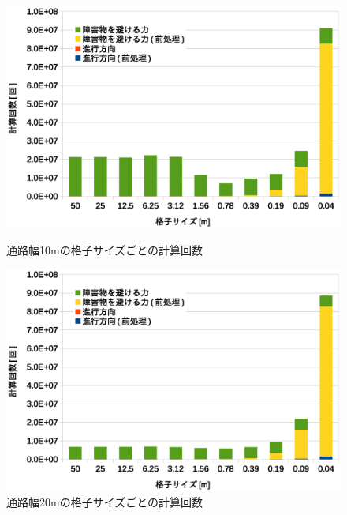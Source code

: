\begin{figure}[tb]
	\begin{minipage}[b]{0.48\columnwidth}
		\begin{center}
		\includegraphics[width=\columnwidth]{figure/5_result_10m_times.eps}
		\caption{通路幅10mの格子サイズごとの計算回数}
		\label{fig:result_10m_times}
		\end{center}
	\end{minipage}
	\hspace{0.04\columnwidth}
	\begin{minipage}[b]{0.48\columnwidth}
		\begin{center}
		\includegraphics[width=\columnwidth]{figure/5_result_20m_times.eps}
		\caption{通路幅20mの格子サイズごとの計算回数}
		\label{fig:result_20m_times}
		\end{center}
	\end{minipage}
\end{figure}
